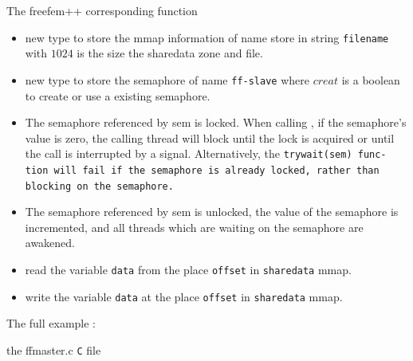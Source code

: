 \documentclass[a4paper,twoside,12pt]{book}
\begin{document}
The freefem++ corresponding function 
\begin{itemize}
\item {} new type to store the mmap information of  name store in string \texttt{filename} with
$1024$ is the size the sharedata zone and file.  
\item {}  new type to store the semaphore of name \texttt{ff-slave} where 
$creat$ is a boolean to create or use a existing semaphore.
\item {} The semaphore referenced by sem is locked.  When calling , if the semaphore's value is zero, the calling thread will block until the lock is acquired or until the call is interrupted by a signal. Alternatively, the \tt{trywait(sem)} func-
     tion will fail if the semaphore is already locked, rather than blocking on the semaphore.
\item {} The semaphore referenced by sem is unlocked, the value of the semaphore is incremented, and all threads which are waiting on the semaphore are awakened.
\item {} read  the variable \texttt{data} from the place \texttt{offset} in \texttt{sharedata} mmap.
\item {}  write  the variable \texttt{data} at the place \texttt{offset} in \texttt{sharedata} mmap.
\end{itemize}

The full example :

the ffmaster.c  \texttt{C} file
\bFF
\end{document}
